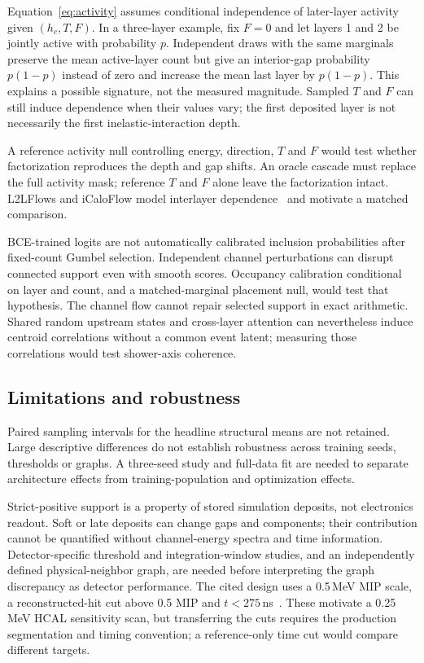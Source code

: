 \documentclass[11pt]{article}
\begin{document}
Equation~\eqref{eq:activity} assumes conditional independence of later-layer activity given $(h_c,T,F)$. In a three-layer example, fix $F=0$ and let layers 1 and 2 be jointly active with probability $p$. Independent draws with the same marginals preserve the mean active-layer count but give an interior-gap probability $p(1-p)$ instead of zero and increase the mean last layer by $p(1-p)$. This explains a possible signature, not the measured magnitude. Sampled $T$ and $F$ can still induce dependence when their values vary; the first deposited layer is not necessarily the first inelastic-interaction depth.

A reference activity null controlling energy, direction, $T$ and $F$ would test whether factorization reproduces the depth and gap shifts. An oracle cascade must replace the full activity mask; reference $T$ and $F$ alone leave the factorization intact. L2LFlows and iCaloFlow model interlayer dependence~\cite{l2lflows,icaloflow} and motivate a matched comparison.

BCE-trained logits are not automatically calibrated inclusion probabilities after fixed-count Gumbel selection. Independent channel perturbations can disrupt connected support even with smooth scores. Occupancy calibration conditional on layer and count, and a matched-marginal placement null, would test that hypothesis. The channel flow cannot repair selected support in exact arithmetic. Shared random upstream states and cross-layer attention can nevertheless induce centroid correlations without a common event latent; measuring those correlations would test shower-axis coherence.

\subsection{Limitations and robustness}

Paired sampling intervals for the headline structural means are not retained. Large descriptive differences do not establish robustness across training seeds, thresholds or graphs. A three-seed study and full-data fit are needed to separate architecture effects from training-population and optimization effects.

Strict-positive support is a property of stored simulation deposits, not electronics readout. Soft or late deposits can change gaps and components; their contribution cannot be quantified without channel-energy spectra and time information. Detector-specific threshold and integration-window studies, and an independently defined physical-neighbor graph, are needed before interpreting the graph discrepancy as detector performance. The cited design uses a 0.5\,MeV MIP scale, a reconstructed-hit cut above 0.5 MIP and $t<275$\,ns~\cite{epiczdc}. These motivate a 0.25\,MeV HCAL sensitivity scan, but transferring the cuts requires the production segmentation and timing convention; a reference-only time cut would compare different targets.
\end{document}
